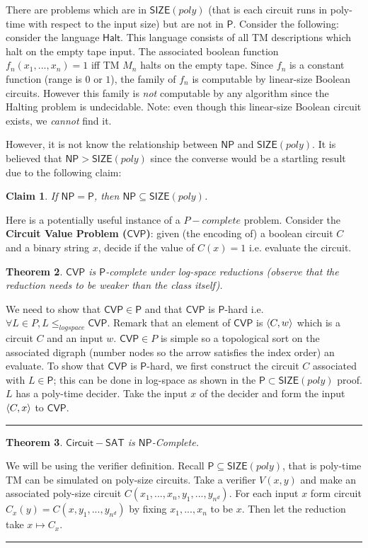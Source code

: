 \documentclass[twoside]{article}
\newcounter{lecnum}
\newtheorem{theorem}{Theorem}[lecnum]
\newtheorem{claim}[theorem]{Claim}
\newenvironment{proof}{{\bf Proof:}}{\hfill\rule{2mm}{2mm}}
\def\P{\mathsf{P}}
\def\NP{\mathsf{NP}}
\def\SIZE{\mathsf{SIZE}}
\def\CVP{\mathsf{CVP}}
\DeclarePairedDelimiter\anglebrac{\langle}{\rangle}
\begin{document}
There are problems which are in $\SIZE (poly)$ (that is each circuit runs in poly-time with respect to the input size) but are not in $\P$. Consider the following: consider the language $\mathsf{Halt}$. This language consists of all TM descriptions which halt on the empty tape input. The associated boolean function $f_n(x_1, ..., x_n) = 1$ iff TM $M_n$ halts on the empty tape. Since $f_n$ is a constant function (range is $0$ or $1$), the family of $f_n$ is computable by linear-size Boolean circuits. However this family is \emph{not} computable by any algorithm since the Halting problem is undecidable. Note: even though this linear-size Boolean circuit exists, we \emph{cannot} find it. 

However, it is not know the relationship between $\NP$ and $\SIZE (poly)$. It is believed that $\NP > \SIZE (poly)$ since the converse would be a startling result due to the following claim:

\begin{claim}
If $\NP = \P$, then $\NP \subseteq \SIZE (poly)$.
\end{claim}   

Here is a potentially useful instance of a $P-complete$ problem. Consider the \textbf{Circuit Value Problem ($\CVP$)}: given (the encoding of) a boolean circuit $C$ and a binary string $x$, decide if the value of $C(x) = 1$ i.e. evaluate the circuit.

\begin{theorem}
$\CVP$ is $\P$-complete under log-space reductions (observe that the reduction needs to be weaker than the class itself). 
\end{theorem}
\begin{proof}
We need to show that $\CVP \in \P$ and that $\CVP$ is $\P$-hard i.e. $\forall L \in P, L \leq_{logspace} \CVP$. Remark that an element of $\CVP$ is $\anglebrac{C, w}$ which is a circuit $C$ and an input $w$. $\CVP \in P$ is simple so a topological sort on the associated digraph (number nodes so the arrow satisfies the index order) an evaluate. To show that $\CVP$ is $\P$-hard, we first construct the circuit $C$ associated with $L \in \P$; this can be done in log-space as shown in the $\P \subset \SIZE(poly)$ proof. $L$ has a poly-time decider. Take the input $x$ of the decider and form the input $\anglebrac{C, x}$ to $\CVP$.  
\end{proof}

\begin{theorem}
$\mathsf{Circuit-SAT}$ is $\NP$-Complete.
\end{theorem}
\begin{proof}
We will be using the verifier definition. Recall $\P \subseteq \SIZE(poly)$, that is poly-time TM can be simulated on poly-size circuits. Take a verifier $V(x, y)$ and make an associated poly-size circuit $C(x_1, ..., x_n, y_1, ..., y_{n^d})$. For each input $x$ form circuit $C_x(y) = C(x, y_1, ..., y_{n^d})$ by fixing $x_1, ..., x_n$ to be $x$. Then let the reduction take $x \mapsto C_x$.                            
\end{proof}
\end{document}
